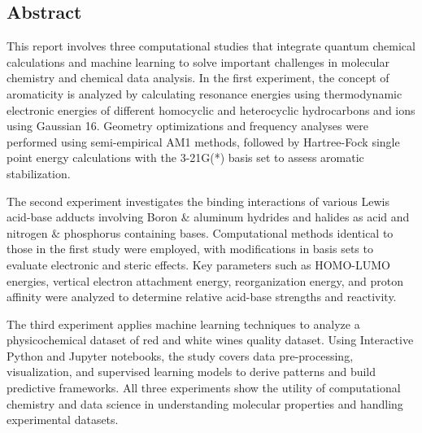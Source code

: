 \begin{center}
\section*{Abstract}
\end{center}
This report involves three computational studies that integrate quantum chemical calculations and machine learning to solve important challenges in molecular chemistry and chemical data analysis. In the first experiment, the concept of aromaticity is analyzed by calculating resonance energies using thermodynamic electronic energies of different homocyclic and heterocyclic hydrocarbons and ions using Gaussian 16. Geometry optimizations and frequency analyses were performed using semi-empirical AM1 methods, followed by Hartree-Fock single point energy calculations with the 3-21G(*) basis set to assess aromatic stabilization.

The second experiment investigates the binding interactions of various Lewis acid-base adducts involving Boron $\&$ aluminum hydrides and halides as acid and nitrogen $\&$ phosphorus containing bases. Computational methods identical to those in the first study were employed, with modifications in basis sets to evaluate electronic and steric effects. Key parameters such as HOMO-LUMO energies, vertical electron attachment energy, reorganization energy, and proton affinity were analyzed to determine relative acid-base strengths and reactivity.

The third experiment applies machine learning techniques to analyze a physicochemical dataset of red and white wines quality dataset. Using Interactive Python and Jupyter notebooks, the study covers data pre-processing, visualization, and supervised learning models to derive patterns and build predictive frameworks. All three experiments show the utility of computational chemistry and data science in understanding molecular properties and handling experimental datasets.


